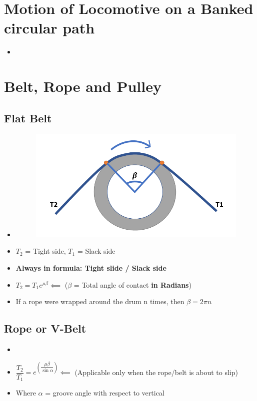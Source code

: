 \documentclass[8pt]{report}
\begin{document}
\section{Motion of Locomotive on a Banked circular path}
	\begin{itemize}
		\item
	\end{itemize}\hrulefill
\section{Belt, Rope and Pulley}
\subsection{Flat Belt}
	\begin{itemize}
		\item {}
		\begin{figure}[H]
			\centering
			\includegraphics[scale=0.4]{flatbelt.png}
		\end{figure}
		\item $T_2$ = Tight side, $T_1$ = Slack side		
		\item \textbf{Always in formula: Tight slide / Slack side}		
		\item $\boxed{T_2=T_1e^{\mu\beta}}\impliedby$ ($\beta$ = Total angle of contact \textbf{in Radians})
		\item If a rope were wrapped around the drum n times, then $\beta=2\pi n$
	\end{itemize}\hrulefill
\subsection{Rope or V-Belt}
	\begin{itemize}
		\item {}	
		\item $\boxed{\dfrac{T_2}{T_1}=e^{\left(\dfrac{\mu\beta}{\sin\alpha}\right)}}\impliedby$ (Applicable only when the rope/belt is about to slip)
		\item Where $\alpha$ = groove angle with respect to vertical
	\end{itemize}\hrulefill
\end{document}
